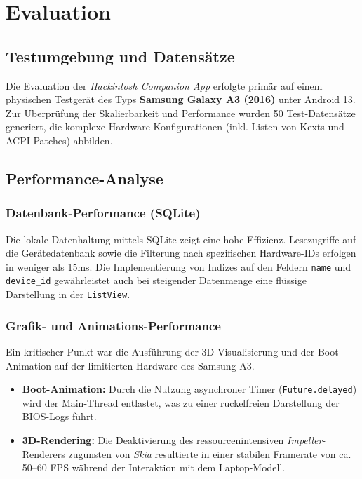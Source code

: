 \chapter{Evaluation} %
\label{sec:evaluation}

\section{Testumgebung und Datensätze}
Die Evaluation der \textit{Hackintosh Companion App} erfolgte primär auf einem physischen Testgerät des Typs \textbf{Samsung Galaxy A3 (2016)} unter Android 13. Zur Überprüfung der Skalierbarkeit und Performance wurden 50 Test-Datensätze generiert, die komplexe Hardware-Konfigurationen (inkl. Listen von Kexts und ACPI-Patches) abbilden.

\section{Performance-Analyse}

\subsection{Datenbank-Performance (SQLite)}
Die lokale Datenhaltung mittels SQLite zeigt eine hohe Effizienz. Lesezugriffe auf die Gerätedatenbank sowie die Filterung nach spezifischen Hardware-IDs erfolgen in weniger als 15ms. Die Implementierung von Indizes auf den Feldern \texttt{name} und \texttt{device\_id} gewährleistet auch bei steigender Datenmenge eine flüssige Darstellung in der \texttt{ListView}.

\subsection{Grafik- und Animations-Performance}
Ein kritischer Punkt war die Ausführung der 3D-Visualisierung und der Boot-Animation auf der limitierten Hardware des Samsung A3.
\begin{itemize}
    \item \textbf{Boot-Animation:} Durch die Nutzung asynchroner Timer (\texttt{Future.delayed}) wird der Main-Thread entlastet, was zu einer ruckelfreien Darstellung der BIOS-Logs führt.
    \item \textbf{3D-Rendering:} Die Deaktivierung des ressourcenintensiven \textit{Impeller}-Renderers zugunsten von \textit{Skia} resultierte in einer stabilen Framerate von ca. 50--60 FPS während der Interaktion mit dem Laptop-Modell.
\end{itemize}

